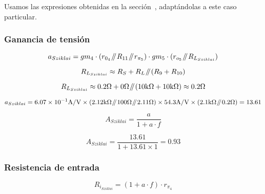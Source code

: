 Usamos las expresiones obtenidas en la sección~, adaptándolas a este caso particular.


\subsubsection{Ganancia de tensión}

\begin{equation}
a_{Sziklai} = gm_{4} \cdot \left( r_{0_{4}} \parallelresistors R_{11} \parallelresistors r_{\pi_{5}} \right) \cdot gm_{5} \cdot \left( r_{o_{5}} \parallelresistors R_{L_{Sziklai}} \right)
\end{equation}

\begin{equation}
R_{L_{Sziklai}} \approx R_{S} + R_{L} \parallelresistors \left( R_{9} + R_{10} \right)
\end{equation}

\begin{equation*}
R_{L_{Sziklai}} \approx 0.2 \si[per-mode=symbol]{\ohm} + 0 \si[per-mode=symbol]{\ohm} \parallelresistors \left( 10 \si[per-mode=symbol]{\kilo\ohm} + 10 \si[per-mode=symbol]{\kilo\ohm} \right) \approx 0.2 \si[per-mode=symbol]{\ohm}
\end{equation*}


\begin{equation*}
a_{Sziklai} = \num{6.07E-1} \si[per-mode=symbol]{\ampere\per\volt} \times \left( 2.12 \si[per-mode=symbol]{\kilo\ohm} \parallelresistors 100 \si[per-mode=symbol]{\ohm} \parallelresistors  2.11 \si[per-mode=symbol]{\ohm} \right) \times 54.3 \si[per-mode=symbol]{\ampere\per\volt} \times \left( 2.1 \si[per-mode=symbol]{\kilo\ohm} \parallelresistors 0.2 \si[per-mode=symbol]{\ohm} \right) = 13.61
\end{equation*}


\begin{equation}
A_{Sziklai} = \frac{a}{1 + a \cdot f}
\end{equation}

\begin{equation*}
A_{Sziklai} = \frac{13.61}{1 + 13.61 \times 1} = 0.93
\end{equation*}

\subsubsection{Resistencia de entrada}

\begin{equation}
R_{i_{Sziklai}} = \left( 1 + a \cdot f \right) \cdot r_{\pi_{4}}
\end{equation}


